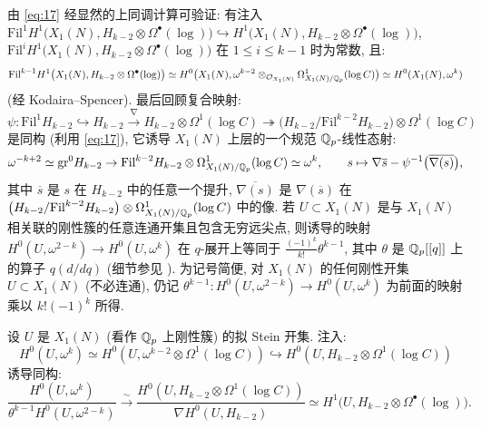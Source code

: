 由 \eqref{eq:17} 经显然的上同调计算可验证: 有注入 $\mathrm{Fil}^{1}H^{1}\bigl(X_1(N),H_{k-2} \otimes \Omega^{\bullet}(\log)\bigr) \hookrightarrow H^{1}\bigl(X_1(N),H_{k-2} \otimes \Omega^{\bullet}(\log)\bigr)$, $\mathrm{Fil}^{i}H^{1}\bigl(X_1(N),H_{k-2} \otimes \Omega^{\bullet}(\log)\bigr)$ 在 $1 \le i \le k-1$ 时为常数, 且:
\[
\mathrm{Fil}^{k-1}H^{1}\bigl(X_1(N),H_{k-2} \otimes \Omega^{\bullet}(\log)\bigr)
\simeq H^{0}\bigl(X_1(N),\omega^{k-2} \otimes_{\mathcal{O}_{X_1(N)}} \Omega^{1}_{X_1(N)/\mathbb{Q}_p}(\log C)\bigr)
\simeq H^{0}(X_1(N),\omega^{k})
\]
(经 Kodaira--Spencer).
最后回顾复合映射:
\[
\psi : \mathrm{Fil}^{1}H_{k-2} \hookrightarrow H_{k-2} \xrightarrow{\nabla} H_{k-2} \otimes \Omega^{1}(\log C) \twoheadrightarrow \bigl(H_{k-2}/\mathrm{Fil}^{k-2}H_{k-2}\bigr) \otimes \Omega^{1}(\log C)
\]
是同构 (利用 \eqref{eq:17}), 它诱导 $X_1(N)$ 上层的一个规范 $\mathbb{Q}_p$-线性态射:
\[
\omega^{-k+2} \simeq \mathrm{gr}^{0}H_{k-2} \to \mathrm{Fil}^{k-2}H_{k-2} \otimes \Omega^{1}_{X_1(N)/\mathbb{Q}_p}(\log C) \simeq \omega^{k},
\qquad
s \mapsto \nabla \overline{s} - \psi^{-1}\bigl(\overline{\nabla(s)}\bigr),
\]
其中 $\overline{s}$ 是 $s$ 在 $H_{k-2}$ 中的任意一个提升, $\overline{\nabla(s)}$ 是 $\nabla(\overline{s})$ 在 $\bigl(H_{k-2}/\mathrm{Fil}^{k-2}H_{k-2}\bigr) \otimes \Omega^{1}_{X_1(N)/\mathbb{Q}_p}(\log C)$ 中的像.
若 $U \subset X_1(N)$ 是与 $X_1(N)$ 相关联的刚性簇的任意连通开集且包含无穷远尖点, 则诱导的映射 $H^{0}(U,\omega^{2-k}) \to H^{0}(U,\omega^{k})$ 在 $q$-展开上等同于 $\frac{(-1)^{k}}{k!}\theta^{k-1}$, 其中 $\theta$ 是 $\mathbb{Q}_p[[q]]$ 上的算子 $q(d/dq)$ (细节参见 \cite[\S9]{ref:12}).
为记号简便, 对 $X_1(N)$ 的任何刚性开集 $U \subset X_1(N)$ (不必连通), 仍记 $\theta^{k-1} : H^{0}(U,\omega^{2-k}) \to H^{0}(U,\omega^{k})$ 为前面的映射乘以 $k!(-1)^{k}$ 所得.

\begin{lemma}\label{lem:4.2.1}
设 $U$ 是 $X_1(N)$ (看作 $\mathbb{Q}_p$ 上刚性簇) 的拟 Stein 开集.
注入:
\[
H^{0}(U,\omega^{k}) \simeq H^{0}(U,\omega^{k-2} \otimes \Omega^{1}(\log C)) \hookrightarrow H^{0}(U,H_{k-2} \otimes \Omega^{1}(\log C))
\]
诱导同构:
\[
\frac{H^{0}(U,\omega^{k})}{\theta^{k-1}H^{0}(U,\omega^{2-k})} \xrightarrow{\sim} \frac{H^{0}(U,H_{k-2} \otimes \Omega^{1}(\log C))}{\nabla H^{0}(U,H_{k-2})} \simeq H^{1}\bigl(U,H_{k-2} \otimes \Omega^{\bullet}(\log)\bigr).
\]
\end{lemma}

